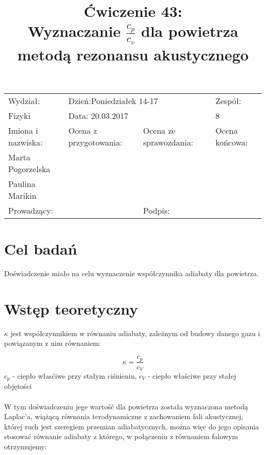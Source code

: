 \documentclass[a4paper,10pt]{article}
\def\arraystretch{1.2}
\begin{document}
\begin{table}
  \centering
  \def\arraystretch{1.5}
    \begin{tabular}{|l|l|l|l|} \hline
    Wydział:           & \multicolumn{2}{l|}{Dzień:Poniedziałek 14-17}    &Zespół:  \\
    Fizyki             &    \multicolumn{2}{l|}{Data: 20.03.2017}         &8             \\\hline
    Imiona i nazwiska: &Ocena z przygotowania:  &Ocena ze sprawozdania:   &Ocena końcowa: \\
    Marta Pogorzelska  &                        &                         &                \\
    Paulina Marikin    &                        &                         &\\\hline
    \multicolumn{2}{|l|}{Prowadzący:                 } &\multicolumn{2}{l|}{Podpis:             }  \\\hline
  \end{tabular}
\end{table}

\title{Ćwiczenie 43:\\Wyznaczanie $\frac{c_p}{c_v}$ dla powietrza metodą rezonansu akustycznego}
\date{}
\maketitle

\section{Cel badań}
Doświadczenie miało na celu wyznaczenie współczynnika adiabaty dla powietrza.

\section{Wstęp teoretyczny}
$\kappa$ jest współczynnikiem w równaniu adiabaty, zależnym od budowy danego gazu i powiązanym z nim równaniem:

\begin{equation}
  \kappa = \frac{c_p}{c_V}
\end{equation}
$c_p$ - ciepło własćiwe przy stałym ciśnieniu, $c_V$ - ciepło właściwe przy stałej objętości
\\\\W tym doświadczeniu jege wartość dla powietrza została wyznaczona metodą Laplac'a, wiążącą równania terodynamiczne z zachowaniem fali akustycznej,
której ruch jest szeregiem przemian adiabatycznych, można więc do jego opisania stosować równanie adiabaty z którego, w połączeniu z równaniem
falowym otrzymujemy:
\end{document}
